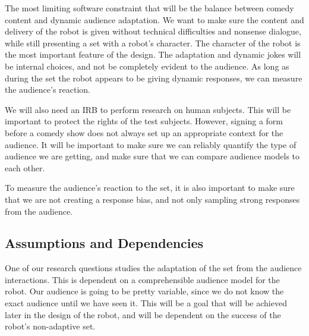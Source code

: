 \documentclass[onecolumn, draftclsnofoot,10pt, compsoc]{IEEEtran}
\begin{document}
The most limiting software constraint that will be the balance between comedy content and dynamic audience adaptation. We want to make sure the content and delivery of the robot is given without technical difficulties and nonsense dialogue, while still presenting a set with a robot’s character. The character of the robot is the most important feature of the design. The adaptation and dynamic jokes will be internal choices, and not be completely evident to the audience. As long as during the set the robot appears to be giving dynamic responses, we can measure the audience’s reaction.

We will also need an IRB to perform research on human subjects. This will be important to protect the rights of the test subjects. However, signing a form before a comedy show does not always set up an appropriate context for the audience. It will be important to make sure we can reliably quantify the type of audience we are getting, and make sure that we can compare audience models to each other.

To measure the audience’s reaction to the set, it is also important to make sure that we are not creating a response bias, and not only sampling strong responses from the audience.


\subsection{Assumptions and Dependencies}


One of our research questions studies the adaptation of the set from the audience interactions. This is dependent on a comprehensible audience model for the robot. Our audience is going to be pretty variable, since we do not know the exact audience until we have seen it. This will be a goal that will be achieved later in the design of the robot, and will be dependent on the success of the robot’s non-adaptive set.
\end{document}
